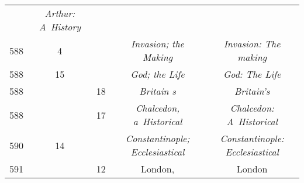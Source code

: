 \documentclass[a4paper,11pt]{article}
\numberwithin{equation}{section}
\begin{document}
\begin{center}
\begin{tabular}{|c|c|c|c|c|}
    & \textit{Arthur: A~History} \\
    588 & \hphantom{0}4 & & \textit{Invasion; the Making}
           & \textit{Invasion: The making} \\
    588 & 15 & & \textit{God; the Life} & \textit{God: The Life} \\
    588 & & 18 & \textit{Britain s} & \textit{Britain's} \\
    588 & & 17 & \textit{Chalcedon, a~Historical}
           & \textit{Chalcedon: A~Historical} \\
    590 & 14 & & \textit{Constantinople; Ecclesiastical}
           & \textit{Constantinople: Ecclesiastical} \\
    591 & & 12 & London, & London \\
    \hline
  \end{tabular}





  \newpage


\end{center}
\end{document}
